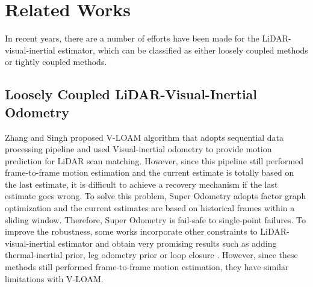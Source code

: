 \section{Related Works}
\label{mrmr-related-works}
In recent years, there are a number of efforts have been made for the LiDAR-visual-inertial estimator, which can be classified as either loosely coupled methods or tightly coupled methods.

\begin{table}[]
	\centering
	\caption{The comparison of multi-modal sensor fusion algorithm }
	\label{tab::sensorfusion}
	\vspace{-3mm}
\end{table}

\subsection{Loosely Coupled LiDAR-Visual-Inertial Odometry}
Zhang and Singh \cite{zhang2018laser} proposed V-LOAM algorithm that adopts sequential data processing pipeline and used Visual-inertial odometry to provide motion prediction for LiDAR scan matching. However, since this pipeline still performed frame-to-frame motion estimation and the current estimate is totally based on the last estimate, it is difficult to achieve a recovery mechanism if the last estimate goes wrong. To solve this problem, Super Odometry adopts factor graph optimization and the current estimates are based on historical frames within a sliding window. Therefore, Super Odometry is fail-safe to single-point failures.
To improve the robustness, some works incorporate other constraints to LiDAR-visual-inertial estimator and obtain very promising results such as adding thermal-inertial prior\cite{multi_modal}, leg odometry prior \cite{camurri2020pronto} or loop closure \cite{Reijgwart_2020}. However, since these methods still performed frame-to-frame motion estimation, they have similar limitations with V-LOAM.


